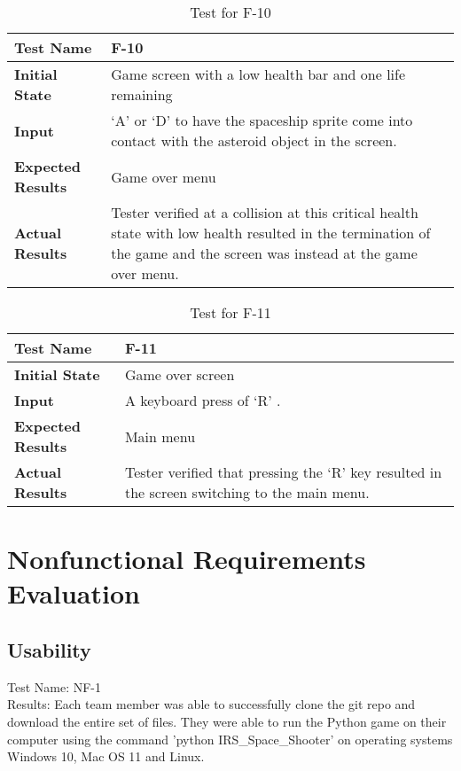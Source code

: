 \documentclass[12pt, titlepage]{article}
\begin{document}
\begin{table}[!htbp]
\begin{tabular}[r]{|l|l|}\hline
\textbf{Test Name} & F-10 \\ \hline
\textbf{Initial State} &    Game screen with a low health bar and one life remaining\\ \hline
\textbf{Input} &`A' or `D' to have the spaceship sprite come into contact with the asteroid object in the screen.\\ \hline 
\textbf{Expected Results} &Game over menu\\ \hline
\textbf{Actual Results} & Tester verified at a collision at this critical health state with low health resulted in the termination of the game and the screen was instead at the game over menu.\\ \hline            
\end{tabular}
\caption{Test for F-10}
\label{Table}
\end{table}

\begin{table}[!htbp]
\begin{tabular}[r]{|l|l|}\hline
\textbf{Test Name} & F-11 \\ \hline
\textbf{Initial State} &  Game over screen\\ \hline
\textbf{Input} &A keyboard press of `R' .\\ \hline 
\textbf{Expected Results} &Main menu\\ \hline
\textbf{Actual Results} & Tester verified that pressing the `R' key resulted in the screen switching to the main menu.\\ \hline            
\end{tabular}
\caption{Test for F-11}
\label{Table}
\end{table}

\section{Nonfunctional Requirements Evaluation}

\subsection{Usability}
Test Name: NF-1
\\ Results: Each team member was able to successfully clone the git repo and download the entire set of files. They were able to run the Python game on their computer using the command 'python IRS\_Space\_Shooter'  on operating systems Windows 10, Mac OS 11 and Linux. 
\end{document}
